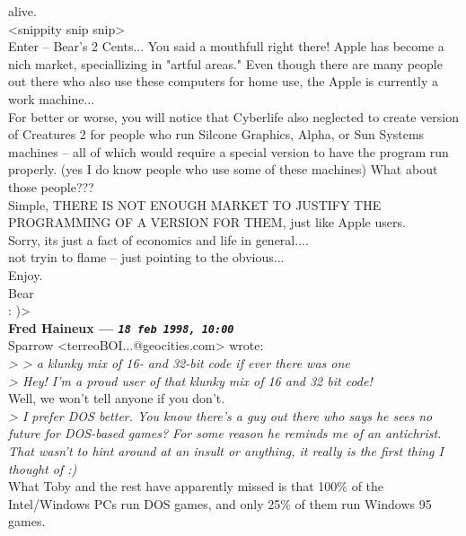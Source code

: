 \documentclass[11pt,twoside,a4paper]{article}
\begin{document}
\begin{multicols*}{2}
alive.~\\
<snippity snip snip>~\\

Enter -- Bear's 2 Cents...
     You said a mouthfull right there!  Apple has become a nich market, speciallizing in "artful areas."  Even though there are many people out there who also use these computers for home use, the Apple is currently a work machine...~\\
   For better or worse, you will notice that Cyberlife also neglected to create version of Creatures 2 for people who run Silcone Graphics, Alpha, or Sun Systems machines -- all of which would require a special version to have the program run properly.  (yes I do know people who use some of these machines)  What about those people???~\\
    Simple, THERE IS NOT ENOUGH MARKET TO JUSTIFY THE PROGRAMMING OF A VERSION FOR THEM, just like Apple users.~\\
     Sorry, its just a fact of economics and life in general....~\\

not tryin to flame -- just pointing to the obvious...~\\

Enjoy.~\\
Bear~\\
     : )>~\\

 
		
	
		
\textbf{Fred Haineux --- \emph{\texttt{18 feb 1998, 10:00}}}~\\

Sparrow <terreoBOI...@geocities.com> wrote:~\\
\emph{> > a klunky mix of 16- and 32-bit code if ever there was one}~\\
\emph{> Hey! I'm a proud user of that klunky mix of 16 and 32 bit code!}~\\

Well, we won't tell anyone if you don't.~\\

\emph{> I prefer DOS better. You know there's a guy out there who says he sees no future for DOS-based games? For some reason he reminds me of an antichrist. That wasn't to hint around at an insult or anything, it really is the first thing I thought of :)}~\\

What Toby and the rest have apparently missed is that 100\% of the Intel/Windows PCs run DOS games, and only 25\% of them run Windows 95 games.~\\


\end{multicols*}
\end{document}

